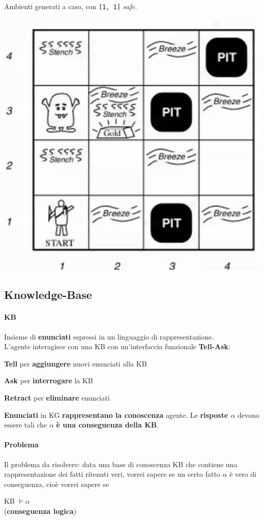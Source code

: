 \documentclass[10pt]{book}
\begin{document}
\begin{multicols}{2}
Ambienti generati a caso, con \texttt{[1, 1]} \textit{safe}.
\begin{center}
	\includegraphics[scale=0.6]{wumpus.png}
\end{center}
\end{multicols}
\subsection{Knowledge-Base}
\paragraph{KB} Insieme di \textbf{enunciati} espressi in un linguaggio di rappresentazione.\\
L'agente interagisce con una KB con un'interfaccia funzionale \textbf{Tell-Ask}:
\begin{list}{}{}
	\item \textbf{Tell} per \textbf{aggiungere} nuovi enunciati alla KB
	\item \textbf{Ask} per \textbf{interrogare} la KB
	\item \textbf{Retract} per \textbf{eliminare} enunciati
\end{list}
\textbf{Enunciati} in KG \textbf{rappresentano la conoscenza} agente. Le \textbf{risposte $\alpha$} devono essere tali che $\alpha$ \textbf{è una conseguenza della KB}.
\paragraph{Problema} Il problema da risolvere: data una base di conoscenza KB che contiene una rappresentazione dei fatti ritenuti veri, vorrei sapere se un certo fatto $\alpha$ è vero di conseguenza, cioè vorrei sapere se 
\begin{center}
KB $\vDash \alpha$\\(\textbf{conseguenza logica})
\end{center}
\pagebreak
\end{document}

